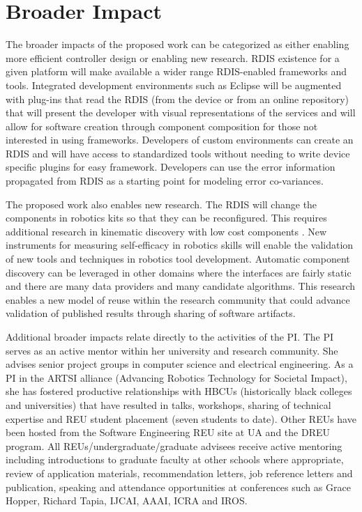 
\section{Broader Impact}\label{sec:bi}

The broader impacts of the proposed work can be categorized as either enabling more efficient controller design or enabling new research.   RDIS existence for a given platform will make available a wider range RDIS-enabled frameworks and tools.  Integrated development environments such as Eclipse will be augmented with plug-ins that read the RDIS (from the device or from an online repository) that will present the developer with visual representations of the services and will allow for software creation through component composition for those not interested in using frameworks.  Developers of custom environments can create an RDIS and will have access to standardized tools without needing to write device specific plugins for easy framework.  Developers can use the error information propagated from RDIS as a starting point for modeling error co-variances.  

The proposed work also enables new research.  The RDIS will change the components in robotics kits so that they can be reconfigured.  This requires additional research in kinematic discovery with low cost components \cite{Croxell2008}.  New instruments for measuring self-efficacy in robotics skills will enable the validation of new tools and techniques in robotics tool development.  Automatic component discovery can be leveraged in other domains where the interfaces are fairly static and there are many data providers and many candidate algorithms.  This research enables a new model of reuse within the research community that could advance validation of published results through sharing of software artifacts. 

Additional broader impacts relate directly to the activities of the PI.  The PI serves as an active mentor within her university and research community.  She advises senior project groups in computer science and electrical engineering.  As a PI in the ARTSI alliance (Advancing Robotics Technology for Societal Impact), she has fostered productive relationships with HBCUs (historically black colleges and universities) that have resulted in talks, workshops, sharing of technical expertise and REU student placement (seven students to date).  Other REUs have been hosted from the Software Engineering REU site at UA and the DREU program. All REUs/undergraduate/graduate advisees receive active mentoring including introductions to graduate faculty at other schools where appropriate, review of application materials, recommendation letters, job reference letters and publication, speaking and attendance opportunities at conferences such as Grace Hopper, Richard Tapia, IJCAI, AAAI, ICRA and IROS.

